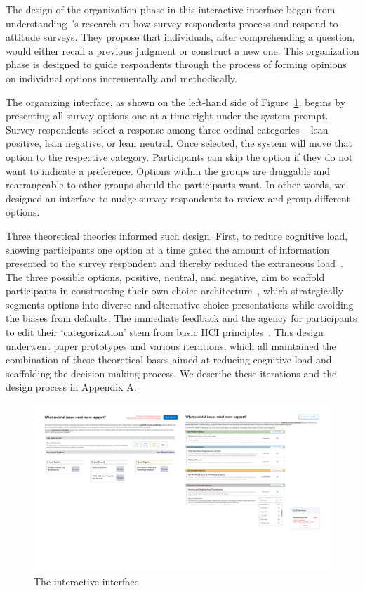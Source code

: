 The design of the organization phase in this interactive interface began from understanding~\textcite{strackThinkingJudgingCommunicating1987}'s research on how survey respondents process and respond to attitude surveys. They propose that individuals, after comprehending a question, would either recall a previous judgment or construct a new one. This organization phase is designed to guide respondents through the process of forming opinions on individual options incrementally and methodically.

The organizing interface, as shown on the left-hand side of Figure~\ref{fig:interactiveInterface}, begins by presenting all survey options one at a time right under the system prompt. Survey respondents select a response among three ordinal categories -- lean positive, lean negative, or lean neutral. Once selected, the system will move that option to the respective category. Participants can skip the option if they do not want to indicate a preference. Options within the groups are draggable and rearrangeable to other groups should the participants want. In other words, we designed an interface to nudge survey respondents to review and group different options.

Three theoretical theories informed such design. First, to reduce cognitive load, showing participants one option at a time gated the amount of information presented to the survey respondent and thereby reduced the extraneous load~\cite{swellerCognitiveLoadTheory2011}. The three possible options, positive, neutral, and negative, aim to scaffold participants in constructing their own choice architecture~\cite{munscherReviewTaxonomyChoice2016, thalerNudgeImprovingDecisions2008a}, which strategically segments options into diverse and alternative choice presentations while avoiding the biases from defaults. The immediate feedback and the agency for participants to edit their `categorization' stem from basic HCI principles~\cite{norman2013design}. This design underwent paper prototypes and various iterations, which all maintained the combination of these theoretical bases aimed at reducing cognitive load and scaffolding the decision-making process. We describe these iterations and the design process in Appendix A.

\begin{figure}[h]
    \centering
    \includegraphics[width=1\textwidth]{content/image/interface.png}
    \caption{The interactive interface}
    \label{fig:interactiveInterface}
\end{figure}

